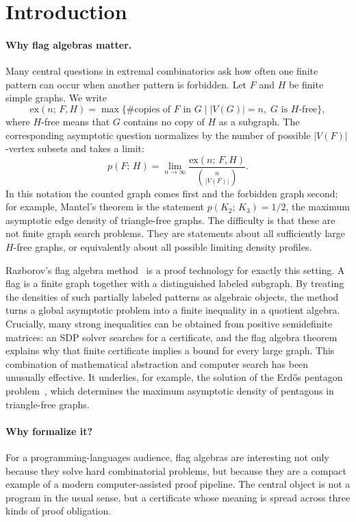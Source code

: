 \documentclass{article}
\newcommand{\tdensity}[2]{p(#1;\,#2)}
\begin{document}
\section{Introduction}
\label{sec:intro}

\paragraph{Why flag algebras matter.}
Many central questions in extremal combinatorics ask how often one finite
pattern can occur when another pattern is forbidden.  Let $F$ and $H$ be
finite simple graphs.  We write
\[
  \mathrm{ex}(n;\,F,H)
  =
  \max\bigl\{
    \#\text{copies of }F\text{ in }G
    \mid |V(G)|=n,\; G\text{ is }H\text{-free}
  \bigr\},
\]
where $H$-free means that $G$ contains no copy of $H$ as a subgraph.  The
corresponding asymptotic question normalizes by the number of possible
$|V(F)|$-vertex subsets and takes a limit:
\[
  \tdensity{F}{H}
  =
  \lim_{n\to\infty}
  \frac{\mathrm{ex}(n;\,F,H)}{\binom{n}{|V(F)|}}.
\]
In this notation the counted graph comes first and the forbidden graph second;
for example, Mantel's theorem is the statement
$\tdensity{K_2}{K_3}=1/2$, the maximum asymptotic edge density of
triangle-free graphs.  The difficulty is that these are not finite graph
search problems.  They are statements about all sufficiently large
$H$-free graphs, or equivalently about all possible limiting density profiles.

Razborov's flag algebra method~\cite{razborov2007flag} is a proof technology
for exactly this setting.  A flag is a finite graph together with a
distinguished labeled subgraph.  By treating the densities of such partially
labeled patterns as algebraic objects, the method turns a global asymptotic
problem into a finite inequality in a quotient algebra.  Crucially, many
strong inequalities can be obtained from positive semidefinite matrices: an
SDP solver searches for a certificate, and the flag algebra theorem explains
why that finite certificate implies a bound for every large graph.  This
combination of mathematical abstraction and computer search has been unusually
effective.  It underlies, for example, the solution of the Erd\H{o}s pentagon
problem~\cite{hatami2012,grzesik2012}, which determines the maximum asymptotic
density of pentagons in triangle-free graphs.

\paragraph{Why formalize it?}
For a programming-languages audience, flag algebras are interesting not only
because they solve hard combinatorial problems, but because they are a
compact example of a modern computer-assisted proof pipeline.  The central
object is not a program in the usual sense, but a certificate whose meaning is
spread across three kinds of proof obligation.
\end{document}
